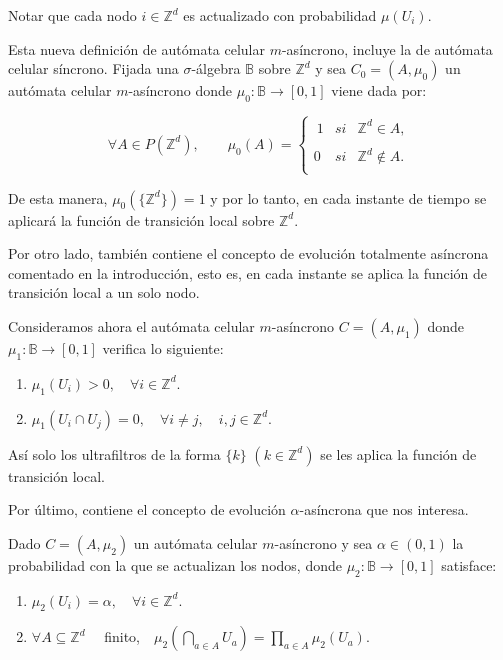 \documentclass[../proyecto.tex]{memoir}
\begin{document}
Notar que cada nodo $i \in \mathds{Z}^{d}$ es actualizado con probabilidad $\mu(U_{i})$.

Esta nueva definición de autómata celular $m$-asíncrono, incluye la de autómata celular síncrono. Fijada una $\sigma$-álgebra $\mathds{B}$ sobre $\mathds{Z}^{d}$ y sea $C_{0}=(A, \mu_{0})$ un autómata celular $m$-asíncrono donde $\mu_{0}: \mathds{B} \rightarrow [0,1]$ viene dada por: 

\begin{equation*}
	 \forall A \in P(\mathds{Z}^{d}), \qquad 
	 \mu_{0}(A) = \left\{ \begin{array}{lcc}
             \ 1 &   si  & \mathds{Z}^{d} \in A ,\\
             \\0 &   si  & \mathds{Z}^{d} \notin A .\\
             \end{array}
             \right.
\end{equation*}

De esta manera, $\mu_{0}(\{\mathds{Z}^{d}\})=1$ y por lo tanto, en cada instante de tiempo se aplicará la función de transición local sobre $\mathds{Z}^{d}$.

Por otro lado, también contiene el concepto de evolución totalmente asíncrona comentado en la introducción, esto es, en cada instante se aplica la función de transición local a un solo nodo. 

\begin{defi}
Consideramos ahora el autómata celular $m$-asíncrono $C=(A, \mu_{1})$ donde $\mu_{1}: \mathds{B} \rightarrow [0,1]$ verifica lo siguiente:

\begin{enumerate}
\item $\mu_{1}(U_{i}) > 0, \quad \forall i \in \mathds{Z}^{d}$.
\item $\mu_{1}(U_{i} \cap U_{j}) = 0, \quad \forall i \neq j, \quad i,j \in \mathds{Z}^{d}$.
\end{enumerate}
\end{defi}

Así solo los ultrafiltros de la forma $\{k\}$ $(k \in \mathds{Z}^{d})$ se les aplica la función de transición local.

Por último, contiene el concepto de evolución $\alpha$-asíncrona que nos interesa. 
\begin{defi} \label{alhpaasin}
Dado $C=(A, \mu_{2})$ un autómata celular $m$-asíncrono y sea $\alpha \in (0,1)$ la probabilidad con la que se actualizan los nodos, donde $\mu_{2}: \mathds{B} \to [0,1]$ satisface:

\begin{enumerate}
\item $\mu_{2}(U_{i}) = \alpha, \quad \forall i \in \mathds{Z}^{d}$.
\item $ \forall A \subseteq \mathds{Z}^{d} \quad$ finito,$\quad  \mu_{2} ( \bigcap_{a \in A} U_{a} ) = \prod_{a \in A} \mu_{2} ( U_{a} )$.
\end{enumerate}
\end{defi}
\end{document}
